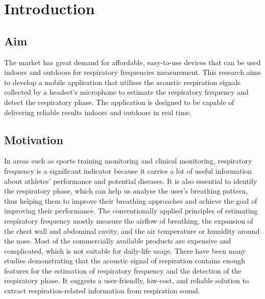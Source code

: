 \chapter{Introduction}
\section{Aim}
The market has great demand for affordable, easy-to-use devices that can be used indoors and outdoors for respiratory frequencies measurement. This research aims to develop a mobile application that utilises the acoustic respiration signals collected by a headset’s microphone to estimate the respiratory frequency and detect the respiratory phase. The application is designed to be capable of delivering reliable results indoors and outdoors in real time.

\section{Motivation}
In areas such as sports training monitoring and clinical monitoring, respiratory frequency is a significant indicator because it carries a lot of useful information about athletes' performance and potential diseases. It is also essential to identify the respiratory phase, which can help us analyse the user's breathing pattern, thus helping them to improve their breathing approaches and achieve the goal of improving their performance. The conventionally applied principles of estimating respiratory frequency mostly measure the airflow of breathing, the expansion of the chest wall and abdominal cavity, and the air temperature or humidity around the nose.\cite{Massaroni2019Contact-BasedRate} Most of the commercially available products are expensive and complicated, which is not suitable for daily-life usage. There have been many studies demonstrating that the acoustic signal of respiration contains enough features for the estimation of respiratory frequency and the detection of the respiratory phase.\cite{Hamke2019DetectingMachines} \cite{Kaur2017UseRespiration}\cite{Ren2015Fine-grainedSmartphones} It suggests a user-friendly, low-cost, and reliable solution to extract respiration-related information from respiration sound. 

